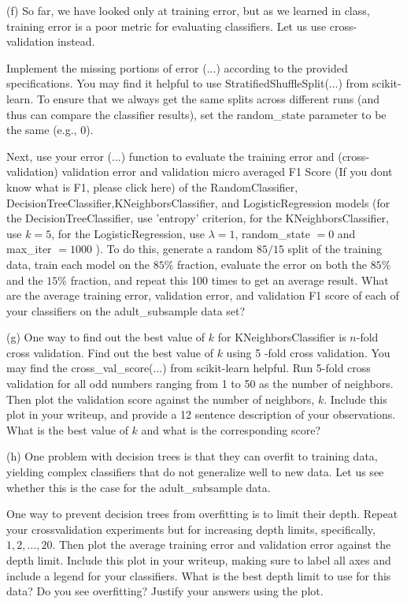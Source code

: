 \documentclass[10pt]{article}
\begin{document}
(f) So far, we have looked only at training error, but as we learned in class, training error is a poor metric for evaluating classifiers. Let us use cross-validation instead.

Implement the missing portions of error (...) according to the provided specifications. You may find it helpful to use StratifiedShuffleSplit(...) from scikit-learn. To ensure that we always get the same splits across different runs (and thus can compare the classifier results), set the random\_state parameter to be the same (e.g., 0).

Next, use your error (...) function to evaluate the training error and (cross-validation) validation error and validation micro averaged F1 Score (If you dont know what is F1, please click here) of the RandomClassifier, DecisionTreeClassifier,KNeighborsClassifier, and LogisticRegression models (for the DecisionTreeClassifier, use 'entropy' criterion, for the KNeighborsClassifier, use $k=5$, for the LogisticRegression, use $\lambda=1$, random\_state $=0$ and max\_iter $=1000$ ). To do this, generate a random $85 / 15$ split of the training data, train each model on the $85 \%$ fraction, evaluate the error on both the $85 \%$ and the $15 \%$ fraction, and repeat this 100 times to get an average result. What are the average training error, validation error, and validation F1 score of each of your classifiers on the adult\_subsample data set?

(g) One way to find out the best value of $k$ for KNeighborsClassifier is $n$-fold cross validation. Find out the best value of $k$ using 5 -fold cross validation. You may find the cross\_val\_score(...) from scikit-learn helpful. Run 5-fold cross validation for all odd numbers ranging from 1 to 50 as the number of neighbors. Then plot the validation score against the number of neighbors, $k$. Include this plot in your writeup, and provide a 12 sentence description of your observations. What is the best value of $k$ and what is the corresponding score?

(h) One problem with decision trees is that they can overfit to training data, yielding complex classifiers that do not generalize well to new data. Let us see whether this is the case for the adult\_subsample data.

One way to prevent decision trees from overfitting is to limit their depth. Repeat your crossvalidation experiments but for increasing depth limits, specifically, $1,2, \ldots, 20$. Then plot the average training error and validation error against the depth limit. Include this plot in your writeup, making sure to label all axes and include a legend for your classifiers. What is the best depth limit to use for this data? Do you see overfitting? Justify your answers using the plot.
\end{document}
